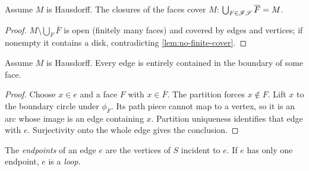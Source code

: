       \begin{lemma}\label{lem:closures-cover}

        Assume $M$ is Hausdorff. The closures of the faces cover $M$:
        $\bigcup_{F\in\mathscr{F}\mathscr{S}}\overline F=M$.
      \end{lemma}
      \begin{proof}

        $M \setminus \bigcup_F \overline{F}$ is open (finitely many faces) and
        covered by edges and vertices; if nonempty it contains a disk,
        contradicting \cref{lem:no-finite-cover}.
      \end{proof}

      \begin{lemma}\label{lem:edge-in-boundary}

        Assume $M$ is Hausdorff. Every edge is entirely contained in the
        boundary of some face.
      \end{lemma}
      \begin{proof}

        Choose $x\in e$ and a face $F$ with $x\in\overline F$. The partition
        forces $x\notin F$. Lift $x$ to the boundary circle under $\phi_F$.
        Its path piece cannot map to a vertex, so it is an arc whose image
        is an edge containing $x$. Partition uniqueness identifies that
        edge with $e$. Surjectivity onto the whole edge gives the conclusion.
      \end{proof}

      \begin{definition}\label{def:endpoints}

        The \emph{endpoints} of an edge $e$ are the vertices of $S$ incident to
        $e$. If $e$ has only one endpoint, $e$ is a \emph{loop}.
      \end{definition}

